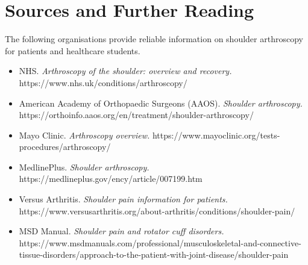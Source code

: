 \section*{Sources and Further Reading}
The following organisations provide reliable information on shoulder arthroscopy for patients and healthcare students.

\begin{itemize}
    \item NHS. \textit{Arthroscopy of the shoulder: overview and recovery.} https://www.nhs.uk/conditions/arthroscopy/
    \item American Academy of Orthopaedic Surgeons (AAOS). \textit{Shoulder arthroscopy.} https://orthoinfo.aaos.org/en/treatment/shoulder-arthroscopy/
    \item Mayo Clinic. \textit{Arthroscopy overview.} https://www.mayoclinic.org/tests-procedures/arthroscopy/
    \item MedlinePlus. \textit{Shoulder arthroscopy.} https://medlineplus.gov/ency/article/007199.htm
    \item Versus Arthritis. \textit{Shoulder pain information for patients.} https://www.versusarthritis.org/about-arthritis/conditions/shoulder-pain/
    \item MSD Manual. \textit{Shoulder pain and rotator cuff disorders.} https://www.msdmanuals.com/professional/musculoskeletal-and-connective-tissue-disorders/approach-to-the-patient-with-joint-disease/shoulder-pain
\end{itemize}
